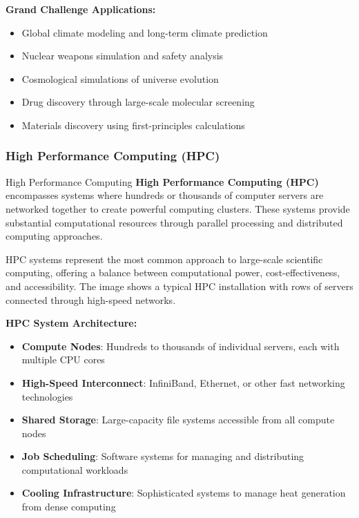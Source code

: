 \textbf{Grand Challenge Applications:}
\begin{itemize}
    \item Global climate modeling and long-term climate prediction
    \item Nuclear weapons simulation and safety analysis
    \item Cosmological simulations of universe evolution
    \item Drug discovery through large-scale molecular screening
    \item Materials discovery using first-principles calculations
\end{itemize}

\subsubsection{High Performance Computing (HPC)}

\begin{conceptcard}{High Performance Computing}
\textbf{High Performance Computing (HPC)} encompasses systems where hundreds or thousands of computer servers are networked together to create powerful computing clusters. These systems provide substantial computational resources through parallel processing and distributed computing approaches.
\end{conceptcard}

HPC systems represent the most common approach to large-scale scientific computing, offering a balance between computational power, cost-effectiveness, and accessibility. The image shows a typical HPC installation with rows of servers connected through high-speed networks.

\textbf{HPC System Architecture:}
\begin{itemize}
    \item \textbf{Compute Nodes}: Hundreds to thousands of individual servers, each with multiple CPU cores
    \item \textbf{High-Speed Interconnect}: InfiniBand, Ethernet, or other fast networking technologies
    \item \textbf{Shared Storage}: Large-capacity file systems accessible from all compute nodes
    \item \textbf{Job Scheduling}: Software systems for managing and distributing computational workloads
    \item \textbf{Cooling Infrastructure}: Sophisticated systems to manage heat generation from dense computing
\end{itemize}

